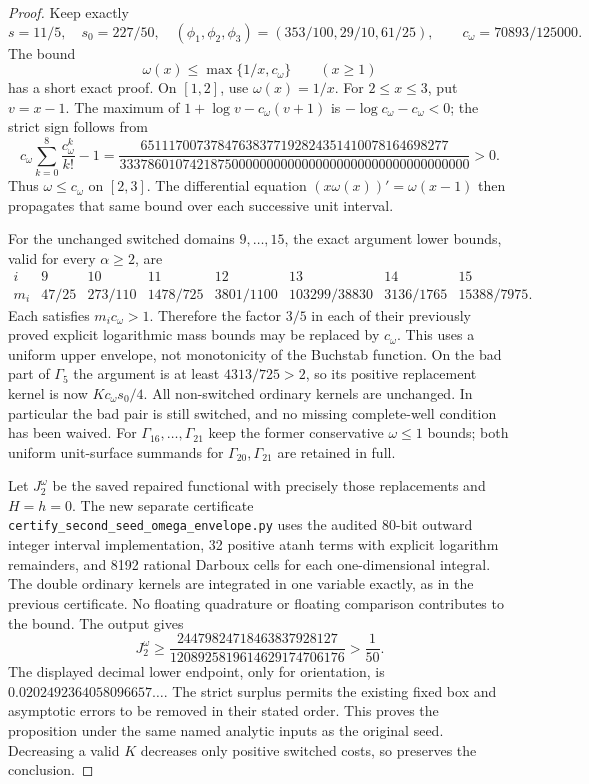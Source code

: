 \begin{proof}
Keep exactly
\[
 s=11/5,\quad s_0=227/50,\quad
 (\phi_1,\phi_2,\phi_3)=(353/100,29/10,61/25),
 \qquad c_\omega=70893/125000.
\]
The bound
\[
 \omega(x)\le\max\{1/x,c_\omega\}\qquad(x\ge1)
\]
has a short exact proof.  On $[1,2]$, use $\omega(x)=1/x$.
For $2\le x\le3$, put $v=x-1$.  The maximum of
$1+\log v-c_\omega(v+1)$ is
$-\log c_\omega-c_\omega<0$; the strict sign follows from
\[
 c_\omega\sum_{k=0}^{8}\frac{c_\omega^k}{k!}-1
 =\frac{65111700737847638377192824351410078164698277}
 {33378601074218750000000000000000000000000000000000}>0.
\]
Thus $\omega\le c_\omega$ on $[2,3]$.  The differential equation
$(x\omega(x))'=\omega(x-1)$ then propagates that same bound over
each successive unit interval.

For the unchanged switched domains $9,\ldots,15$, the exact
argument lower bounds, valid for every $\alpha\ge2$, are
\[
\begin{array}{c|rrrrrrr}
i&9&10&11&12&13&14&15\\\hline
m_i&47/25&273/110&1478/725&3801/1100&103299/38830&3136/1765&15388/7975.
\end{array}
\]
Each satisfies $m_i c_\omega>1$.  Therefore the factor $3/5$ in
each of their previously proved explicit logarithmic mass bounds
may be replaced by $c_\omega$.  This uses a uniform upper envelope,
not monotonicity of the Buchstab function.
On the bad part of $\Gamma_5$ the argument is at least
$4313/725>2$, so its positive replacement kernel is now
$Kc_\omega s_0/4$.
All non-switched ordinary kernels are unchanged.  In particular
the bad pair is still switched, and no missing complete-well
condition has been waived.
For $\Gamma_{16},\ldots,\Gamma_{21}$ keep the former conservative
$\omega\le1$ bounds; both uniform unit-surface summands for
$\Gamma_{20},\Gamma_{21}$ are retained in full.

Let $J_2^{\omega}$ be the saved repaired functional with precisely
those replacements and $H=h=0$.  The new separate certificate
\texttt{certify\_second\_seed\_omega\_envelope.py} uses the audited
80-bit outward integer interval implementation, 32 positive atanh
terms with explicit logarithm remainders, and 8192 rational
Darboux cells for each one-dimensional integral.  The double
ordinary kernels are integrated in one variable exactly, as in
the previous certificate.  No floating quadrature or floating
comparison contributes to the bound.
The output gives
\begin{equation}\label{eq:second-seed-omega-exact-bound}
 J_2^{\omega}\ge
 \frac{24479824718463837928127}
      {1208925819614629174706176}
 >\frac1{50}.
\end{equation}
The displayed decimal lower endpoint, only for orientation, is
$0.0202492364058096657\ldots$.
The strict surplus permits the existing fixed box and asymptotic
errors to be removed in their stated order.  This proves the
proposition under the same named analytic inputs as the original
seed.  Decreasing a valid $K$ decreases only positive switched
costs, so preserves the conclusion.
\end{proof}

